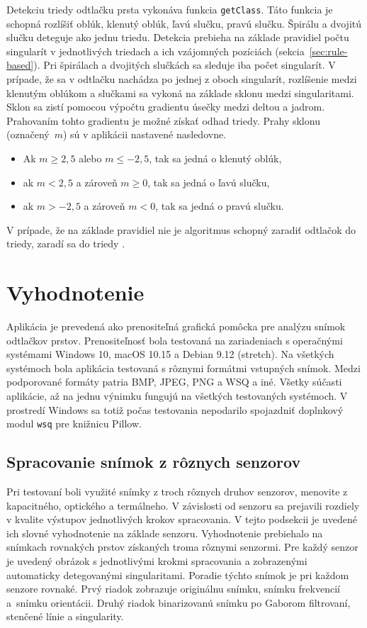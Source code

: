   Detekciu triedy odtlačku prsta vykonáva funkcia \texttt{getClass}. Táto funkcia je schopná rozlíšiť oblúk, klenutý oblúk, ľavú slučku, pravú slučku.
  Špirálu a dvojitú slučku deteguje ako jednu triedu. Detekcia prebieha na základe pravidiel počtu singularít v jednotlivých triedach a ich vzájomných
  pozíciách (sekcia~{\ref{sec:rule-based}}). Pri špirálach a dvojitých slučkách sa sleduje iba počet singularít. V prípade, že sa
  v odtlačku nachádza po jednej z oboch singularít, rozlíšenie medzi klenutým oblúkom a slučkami sa vykoná na základe sklonu medzi singularitami. Sklon sa
  zistí pomocou výpočtu gradientu úsečky medzi deltou a jadrom. Prahovaním tohto gradientu je možné získať odhad triedy. Prahy sklonu (označený~{$m$})
  sú v aplikácii nastavené nasledovne.
  \begin{itemize}
    \item Ak $m \geq 2,5$ alebo $m \leq -2,5$, tak sa jedná o klenutý oblúk,
    \item ak $m < 2,5$ a zároveň $m \geq 0$, tak sa jedná o ľavú slučku,
    \item ak $m > -2,5$ a zároveň $m < 0$, tak sa jedná o pravú slučku.
  \end{itemize}
  V prípade, že na základe pravidiel nie je algoritmus schopný zaradiť odtlačok do triedy, zaradí sa do triedy .

\chapter{Vyhodnotenie} \label{kap:vyhodnotenie}
  Aplikácia je prevedená ako prenositeľná grafická pomôcka pre analýzu snímok odtlačkov prstov. Prenositeľnosť bola testovaná na zariadeniach s operačnými
  systémami Windows 10, macOS 10.15 a Debian 9.12 (stretch). Na všetkých systémoch bola aplikácia testovaná s rôznymi formátmi vstupných snímok. Medzi
  podporované formáty patria BMP, JPEG, PNG a WSQ a iné. Všetky súčasti aplikácie, až na jednu výnimku fungujú na všetkých testovaných systémoch. V prostredí
  Windows sa totiž počas testovania nepodarilo spojazdniť doplnkový modul \texttt{wsq} pre knižnicu Pillow.

  \section{Spracovanie snímok z rôznych senzorov}
  Pri testovaní boli využité snímky z troch rôznych druhov senzorov, menovite z kapacitného, optického a termálneho. V závislosti od senzoru sa prejavili
  rozdiely v kvalite výstupov jednotlivých krokov spracovania. V tejto podsekcii je uvedené ich slovné vyhodnotenie na základe senzoru.
  Vyhodnotenie prebiehalo na snímkach rovnakých prstov získaných troma rôznymi senzormi. Pre každý senzor je uvedený obrázok s jednotlivými krokmi spracovania
  a zobrazenými automaticky detegovanými singularitami. Poradie týchto snímok je pri každom senzore rovnaké. Prvý riadok zobrazuje originálnu snímku, snímku
  frekvencií a~snímku orientácii. Druhý riadok binarizovanú snímku po Gaborom filtrovaní, stenčené línie a singularity.

